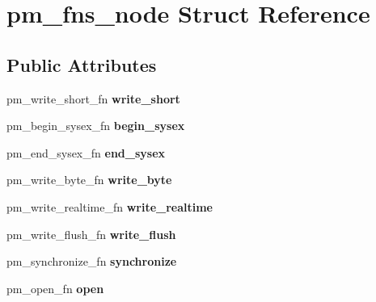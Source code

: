 \hypertarget{structpm__fns__node}{}\section{pm\+\_\+fns\+\_\+node Struct Reference}
\label{structpm__fns__node}
\subsection*{Public Attributes}
\begin{DoxyCompactItemize}
\item 
\mbox{\label{structpm__fns__node_a9ab405eee09c3e4ee7e145c3d0b20d44}} 
pm\+\_\+write\+\_\+short\+\_\+fn {\bfseries write\+\_\+short}
\item 
\mbox{\label{structpm__fns__node_a7374e2a3111143034266df5025dbd55d}} 
pm\+\_\+begin\+\_\+sysex\+\_\+fn {\bfseries begin\+\_\+sysex}
\item 
\mbox{\label{structpm__fns__node_a352068a30a5315dc035c67a89a063acc}} 
pm\+\_\+end\+\_\+sysex\+\_\+fn {\bfseries end\+\_\+sysex}
\item 
\mbox{\label{structpm__fns__node_af5b068dc9632efbb967b37f2fbb65d75}} 
pm\+\_\+write\+\_\+byte\+\_\+fn {\bfseries write\+\_\+byte}
\item 
\mbox{\label{structpm__fns__node_a43aa6c0c76ae0d235fde4a0afce51cf8}} 
pm\+\_\+write\+\_\+realtime\+\_\+fn {\bfseries write\+\_\+realtime}
\item 
\mbox{\label{structpm__fns__node_a507449c19eee96a72872fb16c443b197}} 
pm\+\_\+write\+\_\+flush\+\_\+fn {\bfseries write\+\_\+flush}
\item 
\mbox{\label{structpm__fns__node_add292a3d1444e53bd42a71e9f9fad60c}} 
pm\+\_\+synchronize\+\_\+fn {\bfseries synchronize}
\item 
\mbox{\label{structpm__fns__node_a05cf57c08b47348d05637bfe1da193d2}} 
pm\+\_\+open\+\_\+fn {\bfseries open}
\item 
\mbox{\label{structpm__fns__node_ae0ce4cd25fc61fc3ccb1a56995abe625}} 

\end{DoxyCompactItemize}

